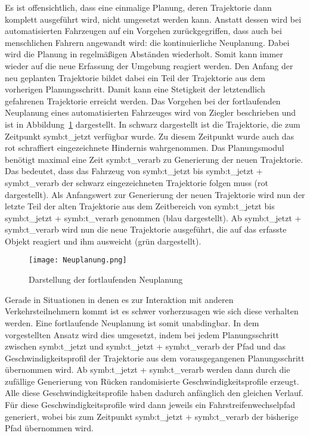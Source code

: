 Es ist offensichtlich, dass eine einmalige Planung, deren Trajektorie dann komplett ausgef\"uhrt wird, nicht umgesetzt werden kann.
Anstatt dessen wird bei automatisierten Fahrzeugen auf ein Vorgehen zur\"uckgegriffen, dass auch bei menschlichen Fahrern angewandt wird: die kontinuierliche Neuplanung.
Dabei wird die Planung in regelm\"a{\ss}igen Abst\"anden wiederholt.
Somit kann immer wieder auf die neue Erfassung der Umgebung reagiert werden.
Den Anfang der neu geplanten Trajektorie bildet dabei ein Teil der Trajektorie aus dem vorherigen Planungsschritt.
Damit kann eine Stetigkeit der letztendlich gefahrenen Trajektorie erreicht werden.
Das Vorgehen bei der fortlaufenden Neuplanung eines automatisierten Fahrzeuges wird von Ziegler \cite{Ziegler2017} beschrieben und ist in Abbildung~\ref{fig:Neuplanung} dargestellt.
In schwarz dargestellt ist die Trajektorie, die zum Zeitpunkt \gls{symb:t_jetzt} verf\"ugbar wurde.
Zu diesem Zeitpunkt wurde auch das rot schraffiert eingezeichnete Hindernis wahrgenommen.
Das Planungsmodul ben\"otigt maximal eine Zeit \gls{symb:t_verarb} zu Generierung der neuen Trajektorie.
Das bedeutet, dass das Fahrzeug von \gls{symb:t_jetzt} bis \gls{symb:t_jetzt} + \gls{symb:t_verarb} der schwarz eingezeichneten Trajektorie folgen muss (rot dargestellt).
Als Anfangswert zur Generierung der neuen Trajektorie wird nun der letzte Teil der alten Trajektorie aus dem Zeitbereich von \gls{symb:t_jetzt} bis \gls{symb:t_jetzt} + \gls{symb:t_verarb} genommen (blau dargestellt).
Ab \gls{symb:t_jetzt} + \gls{symb:t_verarb} wird nun die neue Trajektorie ausgef\"uhrt, die auf das erfasste Objekt reagiert und ihm ausweicht (gr\"un dargestellt).

\begin{figure}[!htbp]
    \centering
    \texttt{[image: Neuplanung.png]}
    \caption[Neuplanung]{Darstellung der fortlaufenden Neuplanung \cite{Ziegler2017}}
    \label{fig:Neuplanung}
\end{figure}


Gerade in Situationen in denen es zur Interaktion mit anderen Verkehrsteilnehmern kommt ist es schwer vorherzusagen wie sich diese verhalten werden.
Eine fortlaufende Neuplanung ist somit unabdingbar.
In dem vorgestellten Ansatz wird dies umgesetzt, indem bei jedem Planungsschritt zwischen \gls{symb:t_jetzt} und \gls{symb:t_jetzt} + \gls{symb:t_verarb} der Pfad und das Geschwindigkeitsprofil der  Trajektorie aus dem vorausgegangenen Planungsschritt \"ubernommen wird.
Ab \gls{symb:t_jetzt} + \gls{symb:t_verarb} werden dann durch die zuf\"allige Generierung von R\"ucken randomisierte Geschwindigkeitsprofile erzeugt.
Alle diese Geschwindigkeitsprofile haben dadurch anf\"anglich den gleichen Verlauf.
F\"ur diese Geschwindigkeitsprofile wird dann jeweils ein Fahrstreifenwechselpfad generiert, wobei bis zum Zeitpunkt \gls{symb:t_jetzt} + \gls{symb:t_verarb} der bisherige Pfad \"ubernommen wird.

